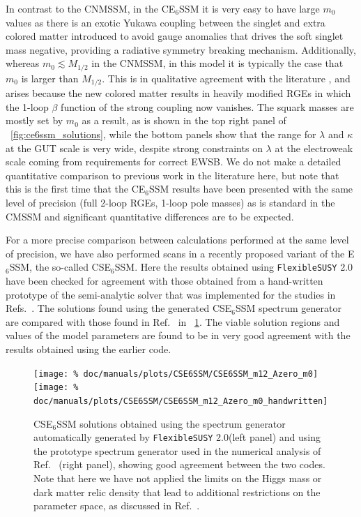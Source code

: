 \documentclass[final,3p,11pt,pdflatex]{elsarticle}
\makeatletter
\newcommand{\fs}{\texttt{FlexibleSUSY}\@\xspace}
\newcommand{\fstwo}{\fs 2.0\@\xspace}
\newcommand{\ESSM}{E$_6$SSM\@\xspace}
\newcommand{\figref}[1]{\figurename~\ref{#1}}
\newcommand{\mhalf}{\ensuremath{M_{1/2}}\xspace}
\newcommand{\mzero}{\ensuremath{m_0}\xspace}
\makeatother
\begin{document}
In contrast to the CNMSSM, in the C\ESSM it is very easy to have large
$\mzero$ values as there is an exotic Yukawa coupling between the singlet and
extra colored matter introduced to avoid gauge anomalies that drives the soft
singlet mass negative, providing a radiative symmetry breaking mechanism.
Additionally, whereas $\mzero \lesssim \mhalf$ in the CNMSSM, in this model
it is typically the case that $\mzero$ is larger than $\mhalf$.  This is
in qualitative agreement with the literature \cite{Athron:2009ue,
  Athron:2009bs,Athron:2012sq,Athron:2012pw}, and arises because the new
colored matter results in heavily modified RGEs in which the 1-loop
$\beta$ function of the strong coupling now vanishes.  The squark masses are
mostly set by $\mzero$ as a result, as is shown in the top right panel of
\figref{fig:ce6ssm_solutions}, while the bottom panels show that the range for
$\lambda$ and $\kappa$ at the GUT scale is very wide, despite strong
constraints on $\lambda$ at the electroweak scale coming from requirements for correct
EWSB\@.   We do not make a detailed quantitative comparison to previous work in
the literature here, but note that this is the first time that the C\ESSM
results have been presented with the same level of precision (full 2-loop RGEs,
1-loop pole masses) as is standard in the CMSSM and significant quantitative
differences are to be expected.

For a more precise comparison between calculations performed at the
same level of precision, we have also performed scans in a recently proposed
variant of the \ESSM, the so-called CS\ESSM \cite{Athron:2015vxg,
  Athron:2016gor}. Here the results obtained using \fstwo have been checked for
agreement with those obtained from a hand-written prototype of the
semi-analytic solver that was implemented for the studies in
Refs.~\cite{Athron:2015vxg,Athron:2016gor}.  The solutions found using the
generated CS\ESSM spectrum generator are compared with those found in
Ref.~\cite{Athron:2016gor} in \figref{fig:cse6ssm_m12_Azero_plane}.  The viable
solution regions and values of the model parameters are found to be in very
good agreement with the results obtained using the earlier code.
%
\begin{figure}[tbh]
  \centering
  \texttt{[image: \%
    doc/manuals/plots/CSE6SSM/CSE6SSM\_m12\_Azero\_m0]}
  \texttt{[image: \%
    doc/manuals/plots/CSE6SSM/CSE6SSM\_m12\_Azero\_m0\_handwritten]}
  \caption{CS\ESSM solutions obtained using the spectrum generator
    automatically generated by \fstwo (left panel) and using the prototype
    spectrum generator used in the numerical analysis of
    Ref.~\cite{Athron:2016gor} (right panel), showing good agreement between
    the two codes.  Note that here we have not applied the limits on the Higgs
    mass or dark matter relic density that lead to additional restrictions on
    the parameter space, as discussed in Ref.~\cite{Athron:2016gor}.}
  \label{fig:cse6ssm_m12_Azero_plane}
\end{figure}
\end{document}
